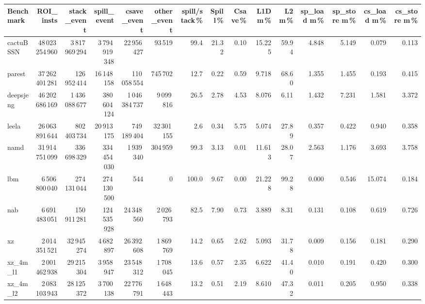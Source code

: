 \documentclass[9pt,landscape,a4paper]{article}
\begin{document}
\vspace{2mm}
\centering
\begin{adjustbox}{max width=\textwidth, max totalheight=0.50\textheight}%
\begin{tabular}{lrrrrrrrrrrrrrr}
\toprule
Benchmark & ROI\_insts & stack\_event & \textbf{spill\_event} & csave\_event & other\_event & spill/stack\,\% & Spill\,\% & Csave\,\% & L1D m\,\% & L2 m\,\% & sp\_load m\,\% & sp\_store m\,\% & cs\_load m\,\% & cs\_store m\,\% \\
\midrule
cactuBSSN & 48\,023\,254\,960 & 3\,817\,969\,294 & 3\,794\,919\,348 & 22\,956\,427 & 93\,519 & 99.4 & 21.32 & 0.10 & 15.225 & 59.94 & 4.848 & 5.149 & 0.079 & 0.113 \\
parest & 37\,262\,401\,281 & 126\,952\,414 & 16\,148\,158 & 110\,058\,554 & 745\,702 & 12.7 & 0.22 & 0.59 & 9.718 & 68.60 & 1.355 & 1.455 & 0.193 & 0.415 \\
deepsjeng & 46\,202\,686\,169 & 1\,436\,088\,677 & 380\,604\,124 & 1\,046\,384\,737 & 9\,099\,816 & 26.5 & 2.78 & 4.53 & 8.076 & 6.11 & 1.432 & 7.231 & 1.581 & 3.372 \\
leela & 26\,063\,891\,644 & 802\,403\,734 & 20\,913\,175 & 749\,189\,404 & 32\,301\,155 & 2.6 & 0.34 & 5.75 & 5.074 & 27.89 & 0.357 & 0.422 & 0.940 & 0.358 \\
namd & 31\,914\,751\,099 & 336\,698\,329 & 334\,454\,030 & 1\,939\,340 & 304\,959 & 99.3 & 3.13 & 0.01 & 11.613 & 28.07 & 2.563 & 1.176 & 3.693 & 3.758 \\
lbm & 6\,506\,800\,040 & 274\,131\,044 & 274\,130\,500 & 544 & 0 & 100.0 & 9.67 & 0.00 & 21.228 & 99.28 & 0.000 & 0.546 & 15.074 & 0.184 \\
nab & 6\,691\,483\,051 & 150\,911\,281 & 124\,535\,928 & 24\,348\,560 & 2\,026\,793 & 82.5 & 7.90 & 0.73 & 3.889 & 8.31 & 0.131 & 0.108 & 0.619 & 0.726 \\
xz & 2\,014\,351\,521 & 32\,945\,274 & 4\,682\,897 & 26\,392\,608 & 1\,869\,769 & 14.2 & 0.65 & 2.62 & 5.093 & 31.78 & 0.009 & 0.156 & 0.181 & 0.290 \\
xz\_4m\_l1 & 2\,001\,462\,938 & 29\,215\,304 & 3\,958\,947 & 23\,548\,312 & 1\,708\,045 & 13.6 & 0.57 & 2.35 & 6.622 & 41.40 & 0.010 & 0.191 & 0.420 & 0.300 \\
xz\_4m\_l2 & 2\,083\,103\,943 & 28\,125\,372 & 3\,700\,138 & 22\,776\,791 & 1\,648\,443 & 13.2 & 0.51 & 2.19 & 8.610 & 47.32 & 0.011 & 0.205 & 0.950 & 0.338 \\

\end{tabular}
\end{adjustbox}
\end{document}
